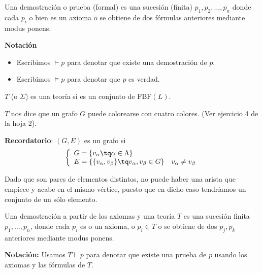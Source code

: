 \begin{defn}
	Una demostración o prueba (formal) es una sucesión (finita) $p_1, p_2, \hdots, p_n$ donde cada $p_i$ o bien es un axioma o se obtiene de dos fórmulas anteriores mediante modus ponens.
\end{defn}

\begin{mdframed}
\textbf{Notación}
\begin{itemize}
	\vspace{-3mm}
	\item Escribimos $\vdash p$ para denotar que existe una demostración de $p$.
	\item Escribimos $\vDash p$ para denotar que $p$ es verdad.
\end{itemize}
\end{mdframed}

\begin{defn}[Teoría]
	$T$ (o $\Sigma$) es una teoría si es un conjunto de FBF$(L)$.
\end{defn}
\begin{example}
	$T$ nos dice que un grafo $G$ puede colorearse con cuatro colores. (Ver ejercicio 4 de la hoja 2).
\end{example}

\noindent \textbf{Recordatorio}: $(G,E)$ es un grafo si
\begin{equation*}
	\left\{
	\begin{array}{l l}
	G=\{v_\alpha \tq \alpha \in \Lambda \} & \\
	E = \left\{\{v_\alpha, v_\beta \}\tq v_\alpha, v_\beta\in G \right\} &  v_\alpha \neq v_\beta
	\end{array}
	\right.
\end{equation*}

Dado que son pares de elementos distintos, no puede haber una arista que empiece y acabe en el mismo vértice, puesto que en dicho caso tendríamos un conjunto de un sólo elemento.

\begin{defn}
	Una demostración a partir de los axiomas y una teoría $T$ es una sucesión finita $p_1, \hdots, p_n$, donde cada $p_i$ es o un axioma, o $p_i\in T$ o se obtiene de dos $p_j,p_k$ anteriores mediante modus ponens.
\end{defn}

\begin{mdframed}
\textbf{Notación: } Usamos $T\vdash p$ para denotar que existe una prueba de $p$ usando los axiomas y las fórmulas de $T$.
\end{mdframed}

